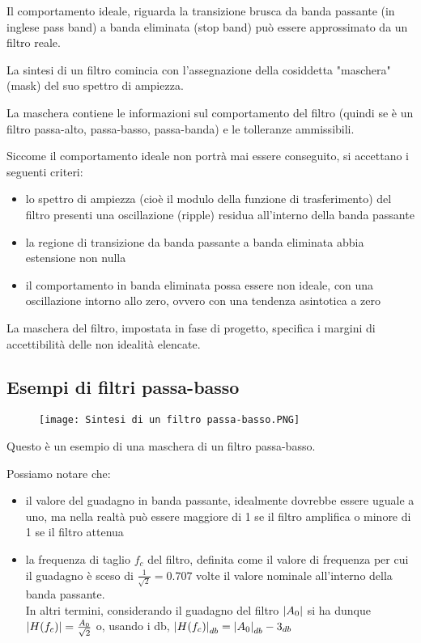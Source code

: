 Il comportamento ideale, riguarda la transizione brusca da banda passante (in inglese pass band) 
a banda eliminata (stop band) può essere approssimato da un filtro reale. \newline 

La sintesi di un filtro comincia con l'assegnazione della cosiddetta "maschera" (mask) del suo spettro di ampiezza. \newline 

La maschera contiene le informazioni sul comportamento del filtro (quindi se è un filtro passa-alto, passa-basso, passa-banda) 
e le tolleranze ammissibili. \newline 

Siccome il comportamento ideale non portrà mai essere conseguito, si accettano i seguenti criteri: 

\begin{itemize}
    \item lo spettro di ampiezza (cioè il modulo della funzione di trasferimento) del filtro presenti una oscillazione (ripple) residua all'interno della banda passante 
    \item la regione di transizione da banda passante a banda eliminata abbia estensione non nulla 
    \item il comportamento in banda eliminata possa essere non ideale, con una oscillazione intorno allo zero, ovvero con una tendenza asintotica a zero 
\end{itemize}

La maschera del filtro, impostata in fase di progetto, specifica i margini di accettibilità delle non idealità elencate. \newline 

\newpage 

\subsection{Esempi di filtri passa-basso} 

\begin{figure}[h]
    \centering
    \texttt{[image: Sintesi di un filtro passa-basso.PNG]}
\end{figure}  

Questo è un esempio di una maschera di un filtro passa-basso. \newline 

Possiamo notare che: 

\begin{itemize}
    \item il valore del guadagno in banda passante, idealmente dovrebbe essere uguale a uno, ma nella realtà può essere maggiore di 1 se il filtro amplifica o minore di 1 se il filtro attenua 
    \item la frequenza di taglio $f_c$ del filtro, definita come il valore di frequenza per cui il guadagno è sceso di $\frac{1}{\sqrt{2}} = 0.707$ volte il valore nominale all'interno della banda passante. \\ 
    In altri termini, considerando il guadagno del filtro $\abs{A_0}$ si ha dunque $\abs{H(f_c)} = \frac{A_0}{\sqrt{2}}$ o, usando i db, $\abs{H(f_c)}_{db} = \abs{A_0}_{db} - 3_{db}$ 
\end{itemize}

